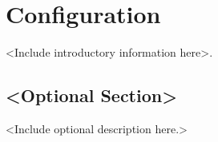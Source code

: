 %


\chapter{Configuration} %

<Include introductory information here>.

\section{<Optional Section>}

<Include optional description here.>


